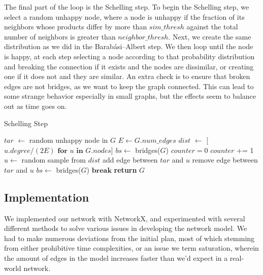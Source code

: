 \documentclass[12pt,twoside]{report}
\begin{document}
The final part of the loop is the Schelling step. To begin the Schelling step, we select a random unhappy node, where a node is unhappy if the fraction of its neighbors whose products differ by more than $sim\_thresh$ against the total number of neighbors is greater than $neighbor\_thresh$. Next, we create the same distribution as we did in the Barabási–Albert step. We then loop until the node is happy, at each step selecting a node according to that probability distribution and breaking the connection if it exists and the nodes are dissimilar, or creating one if it does not and they are similar. An extra check is to ensure that broken edges are not bridges, as we want to keep the graph connected. This can lead to some strange behavior especially in small graphs, but the effects seem to balance out as time goes on. \\

\begin{algorithm}
\caption{Schelling Step}
\begin{algorithmic}
\State $tar$ $\gets$ random unhappy node in $G$
\State $E \gets G.num\_edges$
\State $dist$ $\gets$ [$u.degree / (2E) \textbf{ for } u \textbf{ in } G.nodes$]
\State $bs \gets $ bridges($G$) 
\State $counter = 0$
\State $counter$ += 1
\State $u \gets$ random sample from $dist$
\State add edge between $tar$ and $u$
\EndIf
{}
\State remove edge between $tar$ and $u$
\State $bs \gets $ bridges($G$) 
\EndIf
{} 
\State $\textbf{break}$
\EndIf
\EndWhile
\State \textbf{return} $G$
\EndFunction
\end{algorithmic}
\end{algorithm}

\subsection{Implementation}

We implemented our network with NetworkX, and experimented with several different methods to solve various issues in developing the network model. We had to make numerous deviations from the initial plan, most of which stemming from either prohibitive time complexities, or an issue we term saturation, wherein the amount of edges in the model increases faster than we'd expect in a real-world network. \\
\end{document}
